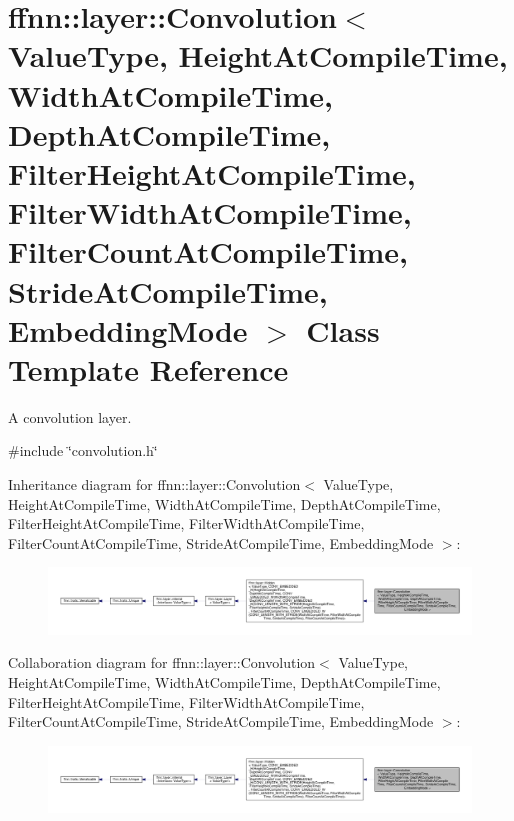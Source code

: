 \hypertarget{classffnn_1_1layer_1_1_convolution}{\section{ffnn\-:\-:layer\-:\-:Convolution$<$ Value\-Type, Height\-At\-Compile\-Time, Width\-At\-Compile\-Time, Depth\-At\-Compile\-Time, Filter\-Height\-At\-Compile\-Time, Filter\-Width\-At\-Compile\-Time, Filter\-Count\-At\-Compile\-Time, Stride\-At\-Compile\-Time, Embedding\-Mode $>$ Class Template Reference}
\label{classffnn_1_1layer_1_1_convolution}
}


A convolution layer.  




{\ttfamily \#include \char`\"{}convolution.\-h\char`\"{}}



Inheritance diagram for ffnn\-:\-:layer\-:\-:Convolution$<$ Value\-Type, Height\-At\-Compile\-Time, Width\-At\-Compile\-Time, Depth\-At\-Compile\-Time, Filter\-Height\-At\-Compile\-Time, Filter\-Width\-At\-Compile\-Time, Filter\-Count\-At\-Compile\-Time, Stride\-At\-Compile\-Time, Embedding\-Mode $>$\-:
\nopagebreak
\begin{figure}[H]
\begin{center}
\leavevmode
\includegraphics[width=350pt]{classffnn_1_1layer_1_1_convolution__inherit__graph}
\end{center}
\end{figure}


Collaboration diagram for ffnn\-:\-:layer\-:\-:Convolution$<$ Value\-Type, Height\-At\-Compile\-Time, Width\-At\-Compile\-Time, Depth\-At\-Compile\-Time, Filter\-Height\-At\-Compile\-Time, Filter\-Width\-At\-Compile\-Time, Filter\-Count\-At\-Compile\-Time, Stride\-At\-Compile\-Time, Embedding\-Mode $>$\-:
\nopagebreak
\begin{figure}[H]
\begin{center}
\leavevmode
\includegraphics[width=350pt]{classffnn_1_1layer_1_1_convolution__coll__graph}
\end{center}
\end{figure}
